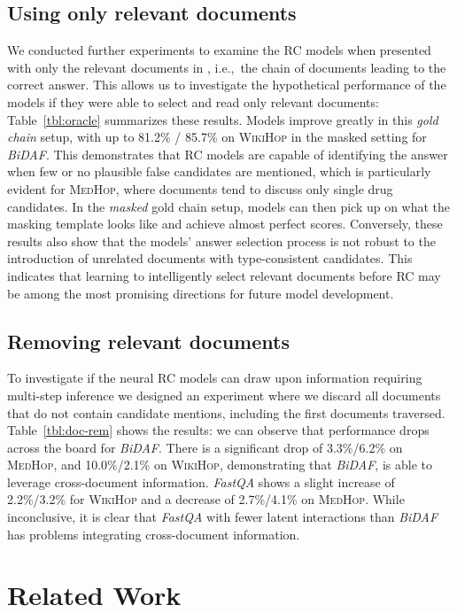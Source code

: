 \documentclass[11pt,letterpaper]{article}
\newcommand{\BiDAF}{\emph{BiDAF}\xspace}
\newcommand{\FastQA}{\emph{FastQA}\xspace}
\newcommand{\MedHop}{\textsc{MedHop}\xspace}
\newcommand{\WikiHop}{\textsc{WikiHop}\xspace}
\begin{document}
\subsection{Using only relevant documents}
We conducted further experiments to examine the RC models when presented with only the relevant documents in , i.e.,\ the chain of documents leading to the correct answer.
This allows us to investigate the hypothetical performance of the models if they were able to select and read only relevant documents: Table~\ref{tbl:oracle} summarizes these results.
Models improve greatly in this \emph{gold chain} setup, with up to 81.2\% / 85.7\% on \WikiHop in the masked setting for \emph{BiDAF}.
This demonstrates that RC models are capable of identifying the answer when few or no plausible false candidates are mentioned, which is particularly evident for \MedHop, where documents tend to discuss only single drug candidates.
In the \emph{masked} gold chain setup, models can then pick up on what the masking template looks like and achieve almost perfect scores.
Conversely, these results also show that the models' answer selection process is not robust to the introduction of unrelated documents with type-consistent candidates.
This indicates that learning to intelligently select relevant documents before RC may be among the most promising directions for future model development.




\subsection{Removing relevant documents}
To investigate if the neural RC models can draw upon information requiring multi-step inference we designed an experiment where we discard all documents that do not contain candidate mentions, including the first documents traversed.
Table~\ref{tbl:doc-rem} shows the results: we can observe that performance drops across the board for \BiDAF.
There is a significant drop of 3.3\%/6.2\% on \MedHop, and 10.0\%/2.1\% on \WikiHop, demonstrating that \BiDAF, is able to leverage cross-document information.
\FastQA shows a slight increase of 2.2\%/3.2\% for \WikiHop and a decrease of 2.7\%/4.1\% on \MedHop.
While inconclusive, it is clear that \FastQA with fewer latent interactions than \BiDAF has problems integrating cross-document information.




\section{Related Work}
\end{document}
